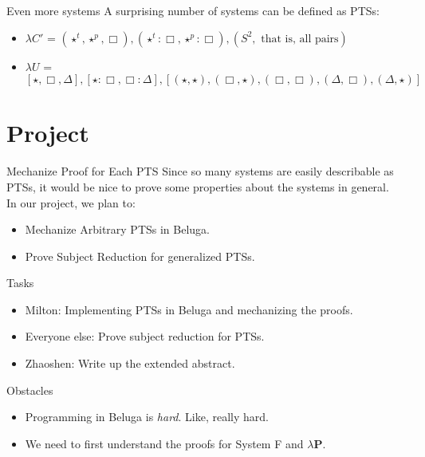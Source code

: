 \documentclass{beamer}
\begin{document}
    \begin{frame}{Even more systems}
        A surprising number of systems can be defined as PTSs:
        \begin{itemize}\small
            \item<1-> $\lambda C'$ = $(\star^t, \star^p, \Box), (\star^t : \Box, \star^p : \Box), (S^2, \text{ that is, all pairs})$
            \item<2-> $\lambda U$ = $[\star, \Box, \Delta], [\star : \Box, \Box : \Delta], [(\star, \star), (\Box, \star), (\Box, \Box), (\Delta, \Box), (\Delta, \star)]$
        \end{itemize}
    \end{frame}

    \section{Project}

    \begin{frame}{Mechanize Proof for Each PTS}
        Since so many systems are easily describable as PTSs, it would be nice to prove some properties about the systems in general. \\
        In our project, we plan to: 
        \begin{itemize}
            \item<1-> Mechanize Arbitrary PTSs in Beluga.
            \item<2-> Prove Subject Reduction for generalized PTSs.
        \end{itemize}
    \end{frame}

    \begin{frame}{Tasks}
        \begin{itemize}
            \item<1-> Milton: Implementing PTSs in Beluga and mechanizing the proofs.
            \item<2-> Everyone else: Prove subject reduction for PTSs.
            \item<3-> Zhaoshen: Write up the extended abstract.
        \end{itemize}
    \end{frame}

    \begin{frame}{Obstacles}
        \begin{itemize}
            \item<1-> Programming in Beluga is \textit{hard}. \pause Like, really hard.
                \pause
            \item<2-> We need to first understand the proofs for System \textsf{F} and $\lambda\mathbf{P}$.
        \end{itemize}
    \end{frame}
\end{document}
